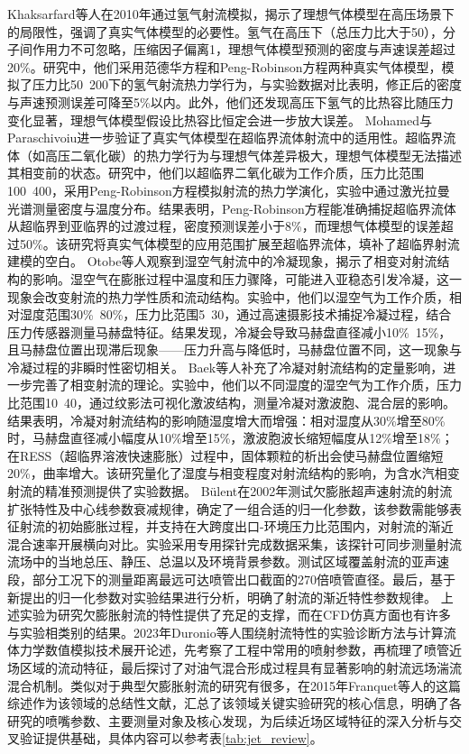 Khaksarfard等人在2010年通过氢气射流模拟\supercite{khaksarfard2010numerical}，揭示了理想气体模型在高压场景下的局限性，强调了真实气体模型的必要性。氢气在高压下（总压力比大于50），分子间作用力不可忽略，压缩因子偏离1，理想气体模型预测的密度与声速误差超过20\%。研究中，他们采用范德华方程和Peng-Robinson方程两种真实气体模型，模拟了压力比50~200下的氢气射流热力学行为，与实验数据对比表明，修正后的密度与声速预测误差可降至5\%以内。此外，他们还发现高压下氢气的比热容比随压力变化显著，理想气体模型假设比热容比恒定会进一步放大误差。
Mohamed与Paraschivoiu进一步验证了真实气体模型在超临界流体射流中的适用性\supercite{mohamed2005real}。超临界流体（如高压二氧化碳）的热力学行为与理想气体差异极大，理想气体模型无法描述其相变前的状态。研究中，他们以超临界二氧化碳为工作介质，压力比范围100~400，采用Peng-Robinson方程模拟射流的热力学演化，实验中通过激光拉曼光谱测量密度与温度分布。结果表明，Peng-Robinson方程能准确捕捉超临界流体从超临界到亚临界的过渡过程，密度预测误差小于8\%，而理想气体模型的误差超过50\%。该研究将真实气体模型的应用范围扩展至超临界流体，填补了超临界射流建模的空白。
Otobe等人观察到湿空气射流中的冷凝现象，揭示了相变对射流结构的影响\supercite{kim2009effect}。湿空气在膨胀过程中温度和压力骤降，可能进入亚稳态引发冷凝，这一现象会改变射流的热力学性质和流动结构。实验中，他们以湿空气为工作介质，相对湿度范围30\%~80\%，压力比范围5~30，通过高速摄影技术捕捉冷凝过程，结合压力传感器测量马赫盘特征。结果发现，冷凝会导致马赫盘直径减小10\%~15\%，且马赫盘位置出现滞后现象——压力升高与降低时，马赫盘位置不同，这一现象与冷凝过程的非瞬时性密切相关。
Baek等人补充了冷凝对射流结构的定量影响\supercite{baek2006study}，进一步完善了相变射流的理论。实验中，他们以不同湿度的湿空气为工作介质，压力比范围10~40，通过纹影法可视化激波结构，测量冷凝对激波胞、混合层的影响。结果表明，冷凝对射流结构的影响随湿度增大而增强：相对湿度从30\%增至80\%时，马赫盘直径减小幅度从10\%增至15\%，激波胞波长缩短幅度从12\%增至18\%；在RESS（超临界溶液快速膨胀）过程中，固体颗粒的析出会使马赫盘位置缩短20\%，曲率增大。该研究量化了湿度与相变程度对射流结构的影响，为含水汽相变射流的精准预测提供了实验数据。
Bülent在2002年测试欠膨胀超声速射流的射流扩张特性及中心线参数衰减规律\supercite{yuceil2002scaling}，确定了一组合适的归一化参数，该参数需能够表征射流的初始膨胀过程，并支持在大跨度出口-环境压力比范围内，对射流的渐近混合速率开展横向对比。实验采用专用探针完成数据采集，该探针可同步测量射流流场中的当地总压、静压、总温以及环境背景参数。测试区域覆盖射流的亚声速段，部分工况下的测量距离最远可达喷管出口截面的270倍喷管直径。最后，基于新提出的归一化参数对实验结果进行分析，明确了射流的渐近特性参数规律。
上述实验为研究欠膨胀射流的特性提供了充足的支撑，而在CFD仿真方面也有许多与实验相类别的结果\supercite{gibbons2023eilmer,jin2021nsfnets}。2023年Duronio等人围绕射流特性的实验诊断方法与计算流体力学数值模拟技术展开论述\supercite{duronio2023under}，先考察了工程中常用的喷射参数，再梳理了喷管近场区域的流动特征，最后探讨了对油气混合形成过程具有显著影响的射流远场湍流混合机制。类似对于典型欠膨胀射流的研究有很多，在2015年Franquet等人的这篇综述作为该领域的总结性文献\supercite{franquet2015free}，汇总了该领域关键实验研究的核心信息，明确了各研究的喷嘴参数、主要测量对象及核心发现，为后续近场区域特征的深入分析与交叉验证提供基础，具体内容可以参考表\ref{tab:jet_review}。
